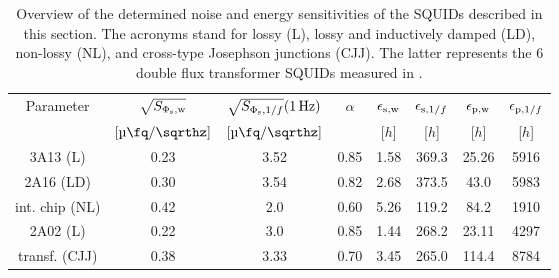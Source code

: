 \begin{table}[h!]
	\centering
	\begin{tabular}{c|*{7}{c}}
		\toprule
		Parameter & $\sqrt{S_{\rm \Phi_{\rm s},w}}$ & $\sqrt{S_{\Phi_{\rm s},1/f}}(\qty{1}{\Hz})$ & $\alpha$ & $\epsilon_{\rm s,w}$ & $\epsilon_{{\rm s},1/f}$ & $\epsilon_{\rm p,w}$ & $\epsilon_{{\rm p},1/f}$ \\
		& $[\unit[per-mode=symbol]{\micro\fq\per\sqrthz}]$ & $[\unit[per-mode=symbol]{\micro\fq\per\sqrthz}]$ &  & [$h$] & [$h$] & [$h$] & [$h$] \\
		\midrule
		3A13 (L) & 0.23 & 3.52 & 0.85 & 1.58 & 369.3 & 25.26 & 5916 \\
		2A16 (LD) & 0.30 & 3.54 & 0.82 & 2.68 & 373.5 & 43.0 & 5983 \\
		int. chip (NL) & 0.42 & 2.0 & 0.60 & 5.26 & 119.2 & 84.2 & 1910 \\
		2A02 (L) & 0.22 & 3.0 & 0.85 & 1.44 & 268.2 & 23.11 & 4297 \\
		transf. (CJJ) & 0.38 & 3.33 & 0.70 & 3.45 & 265.0 & 114.4 & 8784 \\
	\end{tabular}
	\caption{Overview of the determined noise and energy sensitivities of the SQUIDs described in this section. The acronyms stand for lossy (L), lossy and inductively damped (LD), non-lossy (NL), and cross-type Josephson junctions (CJJ). The latter represents the \qty{6}{\nH} double flux transformer SQUIDs measured in \cite{Bauer2022}.}
	\label{tab:noise}
\end{table}
 
